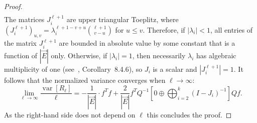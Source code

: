 \documentclass{article}
\newcommand{\dirE}{\vec{E}}
\DeclareMathOperator{\var}{var}
\begin{document}
\begin{proof}
\begin{align}
    \end{align}
    The matrices $J_i^{\ell+1}$ are upper triangular Toeplitz, 
    where $(J_i^{\ell+1})_{u,v} = \lambda_i^{\ell+1-v+u} \binom{\ell+1}{v-u}$ for $u \leq v$. 
    Therefore, if $|\lambda_i| < 1$, all entries of the matrix $J_i^{\ell+1}$ are bounded in absolute value by some constant that is a function of $|\dirE|$ only.
    Otherwise, if $|\lambda_i|=1$, then necessarily $\lambda_i$ has algebraic multiplicity of one (see~\cite{horn2012matrix}, Corollary~8.4.6), so $J_i$ is a scalar and  $|J_i^{\ell+1}|=1$.
    It follows that the normalized variance converges when $\ell\to\infty$:
    \begin{equation}\label{eq:exact_normalized_variance}
        \lim_{\ell\to\infty} \frac{\var[R_\ell]}{\ell} 
        = - \frac{1}{|\dirE|} \cdot f^T f + \frac{2}{|\dirE|} f^T Q^{-1} \left[0 \oplus \bigoplus_{i=2}^k (I-J_i)^{-1} \right] Q f.
    \end{equation}
    As the right-hand side does not depend on $\ell$ this concludes the proof.
\end{proof}

\end{document}
